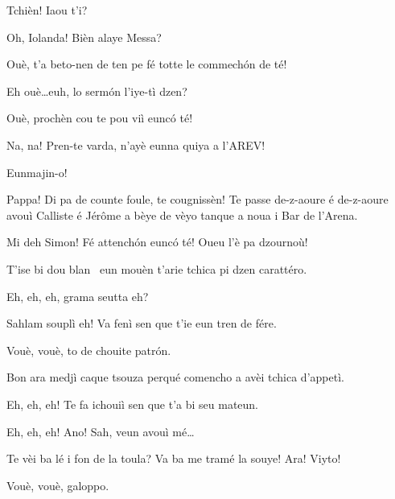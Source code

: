 \begin{drama}
\Iolandaspeaks {} Tchièn! Iaou t'i?


\Cienspeaks {} Oh, Iolanda! Bièn alaye Messa?

\Iolandaspeaks Ouè, t’a beto-nen de ten pe fé totte le commech\'on de té!

\Cienspeaks Eh ouè\ldots euh, lo serm\'on l'iye-tì dzen?

\Iolandaspeaks  Ouè, prochèn cou te pou viì eunc\'o té!

\Cienspeaks Na, na! Pren-te varda, n’ayè eunna quiya a l’AREV!

\Iolandaspeaks Eunmajin-o!

\Simonspeaks Pappa! Di pa de counte foule, te cougnissèn! Te passe de-z-aoure é de-z-aoure avouì Calliste é Jérôme a bèye de vèyo tanque a noua i Bar de l’Arena.

\Cienspeaks Mi deh Simon! Fé attench\'on eunc\'o té! Oueu l’è pa dzournoù!

\Iolandaspeaks T’ise bi dou blan \vino\ eun mouèn t’arie tchica pi dzen carattéro.

\Sahlammspeaks {}  Eh, eh, eh, grama seutta eh?

\Cienspeaks Sahlam souplì eh! Va fenì sen que t’ie eun tren de fére.

\Sahlammspeaks Vouè, vouè, to de chouite patr\'on.


\Cienspeaks {} Bon ara medjì caque tsouza perqué comencho a avèi tchica d’appetì.

\Sahlammspeaks {} Eh, eh, eh! Te fa ichouiì sen que t’a bi seu mateun. 


\Cienspeaks {} Eh, eh, eh! Ano! Sah, veun avouì mé\ldots


\Cienspeaks {} Te vèi ba lé i fon de la toula? Va ba me tramé la souye! Ara! Viyto! 

\Sahlammspeaks Vouè, vouè, galoppo\galoppe.


\end{drama}
